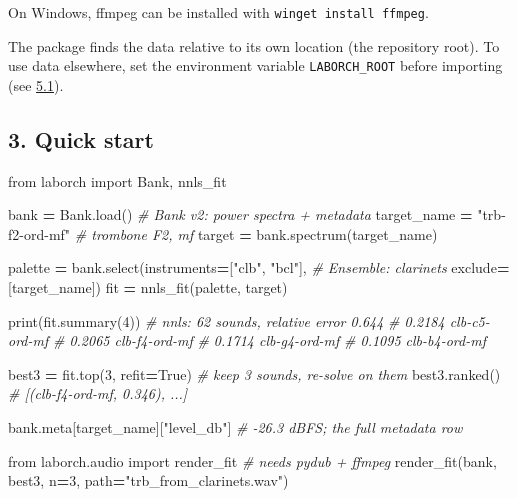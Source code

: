 \documentclass[
  10pt,
]{article}
\newenvironment{Shaded}{\begin{snugshade}}{\end{snugshade}}
\newcommand{\BuiltInTok}[1]{#1}
\newcommand{\CommentTok}[1]{\textcolor[rgb]{0.56,0.35,0.01}{\textit{#1}}}
\newcommand{\DecValTok}[1]{\textcolor[rgb]{0.00,0.00,0.81}{#1}}
\newcommand{\ImportTok}[1]{#1}
\newcommand{\NormalTok}[1]{#1}
\newcommand{\OperatorTok}[1]{\textcolor[rgb]{0.81,0.36,0.00}{\textbf{#1}}}
\newcommand{\StringTok}[1]{\textcolor[rgb]{0.31,0.60,0.02}{#1}}
\newcommand{\VariableTok}[1]{\textcolor[rgb]{0.00,0.00,0.00}{#1}}
\begin{document}
On Windows, ffmpeg can be installed with
\texttt{winget\ install\ ffmpeg}.

The package finds the data relative to its own location (the
repository root). To use data elsewhere, set the environment
variable \texttt{LABORCH\_ROOT} before importing (see
\protect\hyperlink{51-laborchconfig}{5.1}).

\subsection{3. Quick start}

\begin{Shaded}
\begin{Highlighting}[]
\ImportTok{from}\NormalTok{ laborch }\ImportTok{import}\NormalTok{ Bank, nnls\_fit}

\NormalTok{bank }\OperatorTok{=}\NormalTok{ Bank.load()                     }\CommentTok{\# Bank v2: power spectra + metadata}
\NormalTok{target\_name }\OperatorTok{=} \StringTok{"trb{-}f2{-}ord{-}mf"}          \CommentTok{\# trombone F2, mf}
\NormalTok{target }\OperatorTok{=}\NormalTok{ bank.spectrum(target\_name)}

\NormalTok{palette }\OperatorTok{=}\NormalTok{ bank.select(instruments}\OperatorTok{=}\NormalTok{[}\StringTok{"clb"}\NormalTok{, }\StringTok{"bcl"}\NormalTok{],   }\CommentTok{\# Ensemble: clarinets}
\NormalTok{                      exclude}\OperatorTok{=}\NormalTok{[target\_name])}
\NormalTok{fit }\OperatorTok{=}\NormalTok{ nnls\_fit(palette, target)}

\BuiltInTok{print}\NormalTok{(fit.summary(}\DecValTok{4}\NormalTok{))}
\CommentTok{\# nnls: 62 sounds, relative error 0.644}
\CommentTok{\#     0.2184  clb{-}c5{-}ord{-}mf}
\CommentTok{\#     0.2065  clb{-}f4{-}ord{-}mf}
\CommentTok{\#     0.1714  clb{-}g4{-}ord{-}mf}
\CommentTok{\#     0.1095  clb{-}b4{-}ord{-}mf}

\NormalTok{best3 }\OperatorTok{=}\NormalTok{ fit.top(}\DecValTok{3}\NormalTok{, refit}\OperatorTok{=}\VariableTok{True}\NormalTok{)         }\CommentTok{\# keep 3 sounds, re{-}solve on them}
\NormalTok{best3.ranked()                         }\CommentTok{\# [(\textquotesingle{}clb{-}f4{-}ord{-}mf\textquotesingle{}, 0.346), ...]}

\NormalTok{bank.meta[target\_name][}\StringTok{"level\_db"}\NormalTok{]     }\CommentTok{\# {-}26.3 dBFS; the full metadata row}

\ImportTok{from}\NormalTok{ laborch.audio }\ImportTok{import}\NormalTok{ render\_fit   }\CommentTok{\# needs pydub + ffmpeg}
\NormalTok{render\_fit(bank, best3, n}\OperatorTok{=}\DecValTok{3}\NormalTok{, path}\OperatorTok{=}\StringTok{"trb\_from\_clarinets.wav"}\NormalTok{)}
\end{Highlighting}
\end{Shaded}
\end{document}
